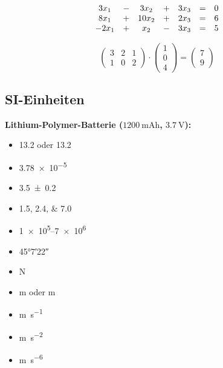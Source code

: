 \documentclass[a4paper, ngerman, oneside, 10pt]{article}
\begin{document}
\begin{equation}
	\begin{array}[t]{c c c c c c c}
		3x_1  & - & 3x_2  & + & 3x_3 & = & 0 \\
		8x_1  & + & 10x_2 & + & 2x_3 & = & 6 \\
		-2x_1 & + & x_2   & - & 3x_3 & = & 5
	\end{array}
\end{equation}

\begin{equation}
	\begin{pmatrix}
		3 & 2 & 1 \\
		1 & 0 & 2
	\end{pmatrix}
	\cdot
	\begin{pmatrix}
		1 \\ 0 \\ 4
	\end{pmatrix}
	=
	\begin{pmatrix}
		7 \\ 9
	\end{pmatrix}
\end{equation}

\subsection{SI-Einheiten}
\textbf{Lithium-Polymer-Batterie (\boldmath$\SI{1200}{\milli\ampere{}\hour}$, $\SI{3,7}{\volt}$):}

\begin{itemize}
	\item \num{13,2} oder \num{13.2}
	\item \num{3,78e-5}
	\item \num{3,5 \pm 0,2}
	\item \numlist{1,5;2,4;7,0}
	\item \numrange{1e5}{7e6}
	\item \ang{45;7;22}
\end{itemize}

\begin{itemize}
	\item \si{\newton}
	\item \si{\meter} oder \si{\m}
	\item \si{\m \per \s}
	\item \si{\m \per \s \squared}
	\item \si{\m \per \s \tothe{6}}
\end{itemize}

\si{\seppi}
\end{document}
